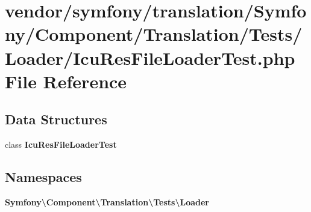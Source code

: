 \section{vendor/symfony/translation/\+Symfony/\+Component/\+Translation/\+Tests/\+Loader/\+Icu\+Res\+File\+Loader\+Test.php File Reference}
\label{_icu_res_file_loader_test_8php}
\subsection*{Data Structures}
\begin{DoxyCompactItemize}
\item 
class {\bf Icu\+Res\+File\+Loader\+Test}
\end{DoxyCompactItemize}
\subsection*{Namespaces}
\begin{DoxyCompactItemize}
\item 
 {\bf Symfony\textbackslash{}\+Component\textbackslash{}\+Translation\textbackslash{}\+Tests\textbackslash{}\+Loader}
\end{DoxyCompactItemize}
